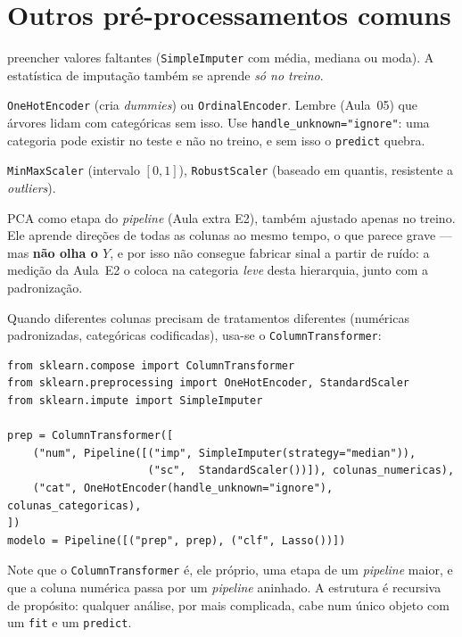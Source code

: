 \documentclass[11pt,a4paper]{article}
\begin{document}
\section{Outros pré-processamentos comuns}
\begin{description}[leftmargin=2.6cm,style=nextline]
  \item[Imputação] preencher valores faltantes (\texttt{SimpleImputer} com média,
        mediana ou moda). A estatística de imputação também se aprende \emph{só no
        treino}.
  \item[Codificação de categóricas] \texttt{OneHotEncoder} (cria \emph{dummies}) ou
        \texttt{OrdinalEncoder}. Lembre (Aula~05) que árvores lidam com categóricas
        sem isso. Use \texttt{handle\_unknown="ignore"}: uma categoria pode existir
        no teste e não no treino, e sem isso o \texttt{predict} quebra.
  \item[Escalas alternativas] \texttt{MinMaxScaler} (intervalo $[0,1]$),
        \texttt{RobustScaler} (baseado em quantis, resistente a \emph{outliers}).
  \item[Redução de dimensão] PCA como etapa do \emph{pipeline} (Aula extra E2),
        também ajustado apenas no treino. Ele aprende direções de todas as colunas
        ao mesmo tempo, o que parece grave --- mas \textbf{não olha o $Y$}, e por
        isso não consegue fabricar sinal a partir de ruído: a medição da Aula~E2 o
        coloca na categoria \emph{leve} desta hierarquia, junto com a padronização.
\end{description}

Quando diferentes colunas precisam de tratamentos diferentes (numéricas
padronizadas, categóricas codificadas), usa-se o \texttt{ColumnTransformer}:
\begin{lstlisting}
from sklearn.compose import ColumnTransformer
from sklearn.preprocessing import OneHotEncoder, StandardScaler
from sklearn.impute import SimpleImputer

prep = ColumnTransformer([
    ("num", Pipeline([("imp", SimpleImputer(strategy="median")),
                      ("sc",  StandardScaler())]), colunas_numericas),
    ("cat", OneHotEncoder(handle_unknown="ignore"), colunas_categoricas),
])
modelo = Pipeline([("prep", prep), ("clf", Lasso())])
\end{lstlisting}
Note que o \texttt{ColumnTransformer} é, ele próprio, uma etapa de um
\emph{pipeline} maior, e que a coluna numérica passa por um \emph{pipeline}
aninhado. A estrutura é recursiva de propósito: qualquer análise, por mais
complicada, cabe num único objeto com um \texttt{fit} e um \texttt{predict}.
\end{document}
